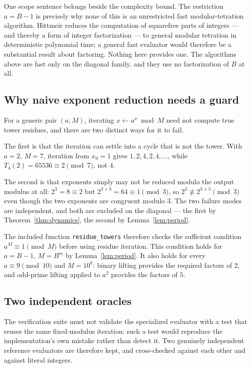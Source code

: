 \documentclass[11pt,letterpaper]{article}
\numberwithin{equation}{section}
\theoremstyle{definition}
\theoremstyle{remark}
\begin{document}
One scope sentence belongs beside the complexity bound. The restriction $a=B-1$ is precisely why none of this is an unrestricted fast modular-tetration algorithm. Hittmeir \cite{hittmeir} reduces the computation of squarefree parts of integers --- and thereby a form of integer factorization --- to general modular tetration in deterministic polynomial time; a general fast evaluator would therefore be a substantial result about factoring. Nothing here provides one. The algorithms above are fast only on the diagonal family, and they use no factorization of $B$ at all.

\subsection{Why naive exponent reduction needs a guard}\label{sec:guard}

For a generic pair $(a,M)$, iterating $x\leftarrow a^x\bmod M$ need not compute true tower residues, and there are two distinct ways for it to fail.

The first is that the iteration can settle into a cycle that is not the tower. With $a=2$, $M=7$, iteration from $x_0=1$ gives $1,2,4,2,4,\ldots$, while $T_4(2)=65536\equiv2\pmod7$, not $4$.

The second is that exponents simply may not be reduced modulo the output modulus at all: $2^3=8\equiv2$ but $2^{3+3}=64\equiv1\pmod3$, so $2^3\not\equiv2^{3+3}\pmod 3$ even though the two exponents are congruent modulo $3$. The two failure modes are independent, and both are excluded on the diagonal --- the first by Theorem~\ref{thm:dynamics}, the second by Lemma~\ref{lem:period}.

The included function \texttt{residue\_towers} therefore checks the sufficient condition $a^M\equiv1\pmod M$ before using residue iteration. This condition holds for $a=B-1$, $M=B^m$ by Lemma~\ref{lem:period}. It also holds for every $a\equiv9\pmod{10}$ and $M=10^k$: binary lifting provides the required factors of $2$, and odd-prime lifting applied to $a^2$ provides the factors of $5$.

\subsection{Two independent oracles}\label{sec:oracles}

The verification suite must not validate the specialized evaluator with a test that reuses the same fixed-modulus iteration: such a test would reproduce the implementation's own mistake rather than detect it. Two genuinely independent reference evaluators are therefore kept, and cross-checked against each other and against literal integers.
\end{document}
